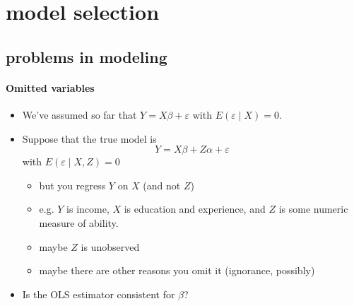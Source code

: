 \section{model selection}
\subsection{problems in modeling}

\paragraph{Omitted variables}
\begin{itemize}
\item We've assumed so far that $Y = X\beta + \varepsilon$
        with $E(\varepsilon \mid X) = 0$.
\item Suppose that the true model is
        \[ Y = X\beta + Z\alpha + \varepsilon \] with $E(\varepsilon
        \mid X, Z) = 0$
\begin{itemize}
\item but you regress $Y$ on $X$ (and not $Z$)
\item e.g. $Y$ is income, $X$ is education and experience, and
          $Z$ is some numeric measure of ability.
\item maybe $Z$ is unobserved
\item maybe there are other reasons you omit it (ignorance, possibly)
\end{itemize}
\item Is the OLS estimator consistent for $\beta$?
\end{itemize}

